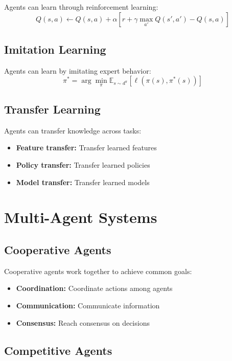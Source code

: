 Agents can learn through reinforcement learning:
\begin{equation}
    Q(s,a) \leftarrow Q(s,a) + \alpha[r + \gamma \max_{a'} Q(s',a') - Q(s,a)]
\end{equation}

\subsection{Imitation Learning}

Agents can learn by imitating expert behavior:
\begin{equation}
    \pi^* = \arg\min_\pi \mathbb{E}_{s \sim d^\pi}[\ell(\pi(s), \pi^*(s))]
\end{equation}

\subsection{Transfer Learning}

Agents can transfer knowledge across tasks:
\begin{itemize}
    \item \textbf{Feature transfer:} Transfer learned features
    \item \textbf{Policy transfer:} Transfer learned policies
    \item \textbf{Model transfer:} Transfer learned models
\end{itemize}

\section{Multi-Agent Systems}

\subsection{Cooperative Agents}

Cooperative agents work together to achieve common goals:
\begin{itemize}
    \item \textbf{Coordination:} Coordinate actions among agents
    \item \textbf{Communication:} Communicate information
    \item \textbf{Consensus:} Reach consensus on decisions
\end{itemize}

\subsection{Competitive Agents}

